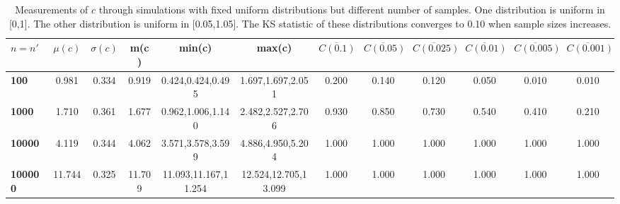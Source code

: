 \begin{table*}[h!]
\vspace{-.3cm}
\begin{center}
\begin{tabular}{| l | c | c | c | c | c | c | c | c | c | c | c |}\hline
$n=n'$ & $\mu(c)$ & $\sigma(c)$ & m(c) & min(c) & max(c) & $\overline{C(0.1)}$ & $\overline{C(0.05)}$ & $\overline{C(0.025)}$ & $\overline{C(0.01)}$ & $\overline{C(0.005)}$ & $\overline{C(0.001)}$ \\\hline\hline
{\bf 100} & 0.981 & 0.334 & 0.919 & 0.424,0.424,0.495 & 1.697,1.697,2.051 & 0.200 & 0.140 & 0.120 & 0.050 & 0.010 & 0.010 \\\hline
{\bf 1000} & 1.710 & 0.361 & 1.677 & 0.962,1.006,1.140 & 2.482,2.527,2.706 & 0.930 & 0.850 & 0.730 & 0.540 & 0.410 & 0.210 \\\hline
{\bf 10000} & 4.119 & 0.344 & 4.062 & 3.571,3.578,3.599 & 4.886,4.950,5.204 & 1.000 & 1.000 & 1.000 & 1.000 & 1.000 & 1.000 \\\hline
{\bf 100000} & 11.744 & 0.325 & 11.709 & 11.093,11.167,11.254 & 12.524,12.705,13.099 & 1.000 & 1.000 & 1.000 & 1.000 & 1.000 & 1.000 \\\hline
\end{tabular}
\caption{Measurements of $c$ through simulations
        with fixed uniform distributions but different number of samples.
        One distribution is uniform in [0,1].
        The other distribution is uniform in [0.05,1.05].
        The KS statistic of these distributions converges
        to 0.10 when sample sizes increases.}
\end{center}
\end{table*}